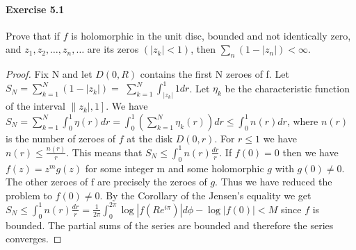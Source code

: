 \documentclass{article}
\begin{document}
\paragraph{Exercise 5.1} Prove that if $f$ is holomorphic in the unit disc, bounded and not identically zero, and $z_{1}, z_{2}, \ldots, z_{n}, \ldots$ are its zeros $\left(\left|z_{k}\right|<1\right)$, then $\sum_{n}\left(1-\left|z_{n}\right|\right)<\infty$.
\begin{proof}
    Fix $\mathrm{N}$ and let $D(0, R)$ contains the first $\mathrm{N}$ zeroes of f. Let $S_N=\sum_{k=1}^N\left(1-\left|z_k\right|\right)=$ $\sum_{k=1}^N \int_{\left|z_k\right|}^1 1 d r$. Let $\eta_k$ be the characteristic function of the interval $\left.\| z_k \mid, 1\right]$. We have $S_N=\sum_{k=1}^N \int_0^1 \eta(r) d r=\int_0^1\left(\sum_{k=1}^N \eta_k(r)\right) d r \leq \int_0^1 n(r) d r$, where $n(r)$ is the number of zeroes of $f$ at the disk $D(0, r)$. For $r \leq 1$ we have $n(r) \leq \frac{n(r)}{r}$. This means that $S_N \leq \int_0^1 n(r) \frac{d r}{r}$. If $f(0)=0$ then we have $f(z)=z^m g(z)$ for some integer $\mathrm{m}$ and some holomorphic $g$ with $g(0) \neq 0$. The other zeroes of $\mathrm{f}$ are precisely the zeroes of $g$. Thus we have reduced the problem to $f(0) \neq 0$. By the Corollary of the Jensen's equality we get $S_N \leq \int_0^1 n(r) \frac{d r}{r}=\frac{1}{2 \pi} \int_0^{2 \pi} \log \left|f\left(R e^{i \pi}\right)\right| d \phi-\log |f(0)|<M$ since $f$ is bounded. The partial sums of the series are bounded and therefore the series converges.
\end{proof}
\end{document}
